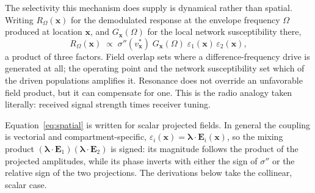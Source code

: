 \documentclass[11pt,a4paper]{article}
\newcommand{\Sig}{\sigma}
\begin{document}
The selectivity this mechanism does supply is dynamical rather than spatial. Writing
$R_\Omega(\mathbf{x})$ for the demodulated response at the envelope frequency $\Omega$
produced at location $\mathbf{x}$, and $G_{\mathbf{x}}(\Omega)$ for the local network
susceptibility there,
\begin{equation}
R_\Omega(\mathbf{x})\;\propto\;\Sig''(v^*_{\mathbf{x}})\;G_{\mathbf{x}}(\Omega)\;
\varepsilon_1(\mathbf{x})\,\varepsilon_2(\mathbf{x}),
\label{eq:spatial}
\end{equation}
a product of three factors. Field overlap sets where a difference-frequency drive is
generated at all; the operating point and the network susceptibility set which of the
driven populations amplifies it. Resonance does not override an unfavorable field
product, but it can compensate for one. This is the radio analogy taken literally:
received signal strength times receiver tuning.

Equation~\eqref{eq:spatial} is written for scalar projected fields. In general the
coupling is vectorial and compartment-specific,
$\varepsilon_i(\mathbf{x})=\boldsymbol{\lambda}\!\cdot\!\mathbf{E}_i(\mathbf{x})$, so the
mixing product $(\boldsymbol{\lambda}\!\cdot\!\mathbf{E}_1)
(\boldsymbol{\lambda}\!\cdot\!\mathbf{E}_2)$ is signed: its magnitude follows the product
of the projected amplitudes, while its phase inverts with either the sign of $\Sig''$ or
the relative sign of the two projections. The derivations below take the collinear,
scalar case.
\end{document}

